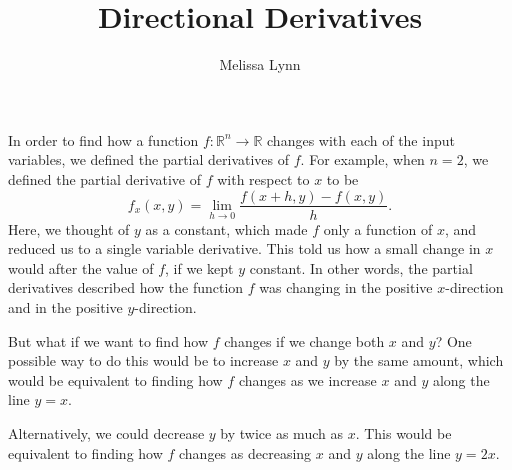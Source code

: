 \documentclass{ximera}
\title{Directional Derivatives}
\author{Melissa Lynn}
\begin{document}
\begin{abstract}
\end{abstract}
\maketitle

In order to find how a function $f:\mathbb{R}^n\rightarrow\mathbb{R}$ changes with each of the input variables, we defined the partial derivatives of $f$. For example, when $n=2$, we defined the partial derivative of $f$ with respect to $x$ to be
\[
f_x(x,y)=\lim_{h\rightarrow 0}\frac{f(x+h,y)-f(x,y)}{h}.
\]
Here, we thought of $y$ as a constant, which made $f$ only a function of $x$, and reduced us to a single variable derivative. This told us how a small change in $x$ would after the value of $f$, if we kept $y$ constant. In other words, the partial derivatives described how the function $f$ was changing in the positive $x$-direction and in the positive $y$-direction.

\begin{image}
\end{image}

But what if we want to find how $f$ changes if we change both $x$ and $y$? One possible way to do this would be to increase $x$ and $y$ by the same amount, which would be equivalent to finding how $f$ changes as we increase $x$ and $y$ along the line $y=x$.

\begin{image}
\end{image}

Alternatively, we could decrease $y$ by twice as much as $x$. This would be equivalent to finding how $f$ changes as decreasing $x$ and $y$ along the line $y=2x$.

\begin{image}
\end{image}
\end{document}
